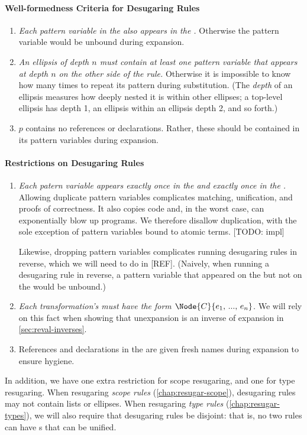 \paragraph{Well-formedness Criteria for Desugaring Rules}
\begin{enumerate}
\item \emph{Each pattern variable in the  also appears in the
  .} Otherwise the pattern variable would be unbound during
  expansion.
\item \emph{An ellipsis of depth $n$ must contain at least one pattern
  variable that appears at depth $n$ on the other side of the rule.}
  Otherwise it is impossible to know how many times to repeat its
  pattern during substitution. (The \emph{depth} of an ellipsis
  measures how deeply nested it is within other ellipses; a top-level
  ellipsis has depth 1, an ellipsis within an ellipsis depth 2, and so
  forth.)
\item $p$ contains no references or declarations. Rather, these
  should be contained in its pattern variables during expansion.
\end{enumerate}

\paragraph{Restrictions on Desugaring Rules}
\begin{enumerate}
\item \emph{Each patern variable appears exactly once in the 
  and exactly once in the .}
  Allowing duplicate pattern variables complicates matching,
  unification, and proofs of correctness. It also copies code and, in
  the worst case, can exponentially blow up programs.  We therefore
  disallow duplication, with the sole exception of pattern variables
  bound to atomic terms. [TODO: impl]
  
  Likewise, dropping pattern variables complicates running desugaring
  rules in reverse, which we will need to do in [REF]. (Naively, when
  running a desugaring rule in reverse, a pattern variable that
  appeared on the  but not on the  would be unbound.)
\item \emph{Each transformation's  must have the form
  $\Node{C}{e_1,\,...,\,e_n}$.} We will rely on this fact when showing that
  unexpansion is an inverse of expansion in \cref{sec:reval-inverses}.
\item References and declarations in the  are given fresh names during
  expansion to ensure hygiene.
\end{enumerate}

In addition, we have one extra restriction for scope resugaring, and
one for type resugaring.
When resugaring \emph{scope rules} (\cref{chap:resugar-scope}),
desugaring rules may not contain lists or ellipses.
When resugaring \emph{type rules} (\cref{chap:resugar-types}), we will also
require that desugaring rules be disjoint: that is, no two rules can
have s that can be unified.
